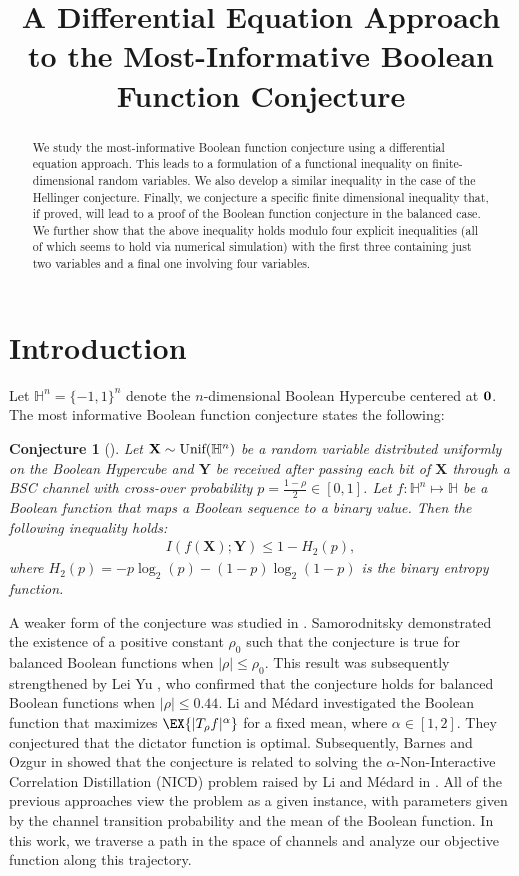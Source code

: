 \documentclass[conference,letterpaper,onecolumn]{IEEEtran}
\title{A Differential Equation Approach to the Most-Informative Boolean Function Conjecture}
\author{%
  \IEEEauthorblockN{Zijie Chen, Amin Gohari, and Chandra Nair}
  \IEEEauthorblockA{Department of Information Engineering\\
The Chinese University of Hong Kong\\
Sha Tin, NT, Hong Kong\\
\{zijie,agohari,chandra\}@ie.cuhk.edu.hk}
}
\theoremstyle{plain}%
\newcommand{\bY}{\mathbf{Y}}
\newcommand{\bX}{\mathbf{X}}
\newcommand{\unif}{\textnormal{Unif}}
\newtheorem{conj}{Conjecture}
\begin{document}
\maketitle
\begin{abstract}
    We study the most-informative Boolean function conjecture using a differential equation approach. This leads to a formulation of a functional inequality on finite-dimensional random variables. We also develop a similar inequality in the case of the Hellinger conjecture. Finally, we conjecture a specific finite dimensional inequality that, if proved, will lead to a proof of the Boolean function conjecture in the balanced case. We further show that the above inequality holds modulo four explicit inequalities (all of which seems to hold via numerical simulation) with the first three containing just two variables and a final one involving four variables.
\end{abstract}

\section{Introduction}
Let $\mathbb{H}^n = \{-1,1\}^n$  denote the $n$-dimensional Boolean Hypercube centered at $\bf{0}$. The most informative Boolean function conjecture states the following:
\begin{conj}[\hspace{1sp}\cite{kumar2013Boolean}]
\label{conj:mi}
    Let $\bX\sim\unif{(\mathbb{H}^n)}$ be a random variable distributed uniformly on the Boolean Hypercube and $\bY$ be received after passing each bit of $\bX$ through a BSC channel with cross-over probability $p = \frac{1 - \rho}{2} \in [0,1]$. Let $f:\mathbb{H}^n\mapsto \mathbb{H}$ be a Boolean function that maps a Boolean sequence to a binary value. Then the following inequality holds:
    \begin{align*}
        I(f(\bX);\bY) \leq 1 - H_2\left(p\right),
    \end{align*}
    where $H_2(p) = -p\log_2(p) - (1-p)\log_2(1-p)$ is the binary entropy function.
\end{conj}

A weaker form of the conjecture  was studied in  
\cite{anantharam2013hypercontractivity}.
Samorodnitsky \cite{7498615} demonstrated the existence of a positive constant $\rho_0$ such that the conjecture is true for balanced Boolean functions when $|\rho| \leq \rho_0$. This result was subsequently strengthened by Lei Yu \cite{Yu23}, who confirmed that the conjecture holds for balanced Boolean functions when $|\rho| \leq 0.44$. Li and M\'{e}dard \cite{9272787} investigated the Boolean function that maximizes $\EX{|T_\rho f|^\alpha}$ for a fixed mean, where $\alpha \in [1,2]$. They conjectured that the dictator function is optimal. Subsequently, Barnes and Ozgur in \cite{9174063} showed that the conjecture is related to solving the $\alpha$-Non-Interactive Correlation Distillation (NICD) problem raised by Li and M\'edard in \cite{9272787}.  All of the previous approaches view the problem as a given instance, with parameters given by the channel transition probability and the mean of the Boolean function. In this work, we traverse a path in the space of channels and analyze our objective function along this trajectory. 
\end{document}

